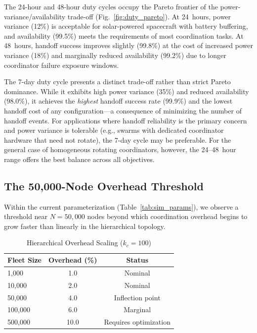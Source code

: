 \documentclass[journal]{IEEEtran}
\begin{document}
The 24-hour and 48-hour duty cycles occupy the Pareto frontier of the power-variance/availability trade-off (Fig.~\ref{fig:duty_pareto}). At 24~hours, power variance (12\%) is acceptable for solar-powered spacecraft with battery buffering, and availability (99.5\%) meets the requirements of most coordination tasks. At 48~hours, handoff success improves slightly (99.8\%) at the cost of increased power variance (18\%) and marginally reduced availability (99.2\%) due to longer coordinator failure exposure windows.

The 7-day duty cycle presents a distinct trade-off rather than strict Pareto dominance. While it exhibits high power variance (35\%) and reduced availability (98.0\%), it achieves the \emph{highest} handoff success rate (99.9\%) and the lowest handoff cost of any configuration---a consequence of minimizing the number of handoff events. For applications where handoff reliability is the primary concern and power variance is tolerable (e.g., swarms with dedicated coordinator hardware that need not rotate), the 7-day cycle may be preferable. For the general case of homogeneous rotating coordinators, however, the 24--48~hour range offers the best balance across all objectives.

\subsection{The 50{,}000-Node Overhead Threshold}

Within the current parameterization (Table~\ref{tab:sim_params}), we observe a threshold near $N = 50{,}000$ nodes beyond which coordination overhead begins to grow faster than linearly in the hierarchical topology.

\begin{table}[t]
    \centering
    \caption{Hierarchical Overhead Scaling ($k_c = 100$)}
    \label{tab:inflection}
    \begin{tabular}{@{}lcc@{}}
        \toprule
        \textbf{Fleet Size} & \textbf{Overhead (\%)} & \textbf{Status} \\
        \midrule
        1{,}000    & 1.0 & Nominal \\
        10{,}000   & 2.0 & Nominal \\
        50{,}000   & 4.0 & Inflection point \\
        100{,}000  & 6.0 & Marginal \\
        500{,}000  & 10.0 & Requires optimization \\
        \bottomrule
    \end{tabular}
\end{table}
\end{document}
